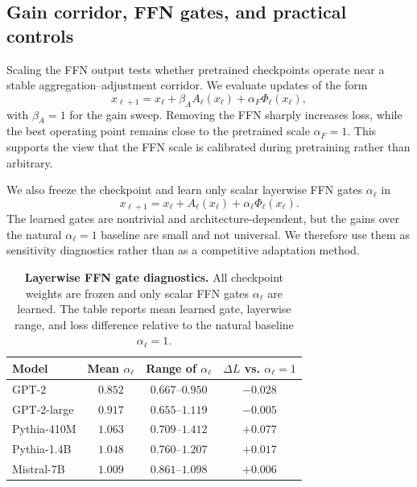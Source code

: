 \documentclass[11pt]{article}
\begin{document}
\subsection{Gain corridor, FFN gates, and practical controls}\label{app:gain-gates-controls}
Scaling the FFN output tests whether pretrained checkpoints operate near a
stable aggregation--adjustment corridor.  We evaluate updates of the form
\begin{equation}
x_{\ell+1}
=
x_\ell
+
\beta_A A_\ell(x_\ell)
+
\alpha_F\Phi_\ell(x_\ell),
\end{equation}
with $\beta_A=1$ for the gain sweep.  Removing the FFN sharply increases loss,
while the best operating point remains close to the pretrained scale
$\alpha_F=1$.  This supports the view that the FFN scale is calibrated during
pretraining rather than arbitrary.

We also freeze the checkpoint and learn only scalar layerwise FFN gates
$\alpha_\ell$ in
\begin{equation}
x_{\ell+1}
=
x_\ell
+
A_\ell(x_\ell)
+
\alpha_\ell\Phi_\ell(x_\ell).
\end{equation}
The learned gates are nontrivial and architecture-dependent, but the gains over
the natural $\alpha_\ell=1$ baseline are small and not universal.  We therefore
use them as sensitivity diagnostics rather than as a competitive adaptation
method.

\begin{table}[H]
\centering
\small
\caption{\textbf{Layerwise FFN gate diagnostics.}  All checkpoint weights are
frozen and only scalar FFN gates $\alpha_\ell$ are learned.  The table reports
mean learned gate, layerwise range, and loss difference relative to the natural
baseline $\alpha_\ell=1$.}
\label{tab:supp-ffn-gates}
\begin{tabular}{lccc}
\toprule
Model & Mean $\alpha_\ell$ & Range of $\alpha_\ell$ & $\Delta L$ vs. $\alpha_\ell=1$ \\
\midrule
GPT-2        & $0.852$ & $0.667$--$0.950$ & $-0.028$ \\
GPT-2-large  & $0.917$ & $0.655$--$1.119$ & $-0.005$ \\
Pythia-410M  & $1.063$ & $0.709$--$1.412$ & $+0.077$ \\
Pythia-1.4B  & $1.048$ & $0.760$--$1.207$ & $+0.017$ \\
Mistral-7B   & $1.009$ & $0.861$--$1.098$ & $+0.006$ \\
\bottomrule
\end{tabular}
\end{table}
\end{document}
